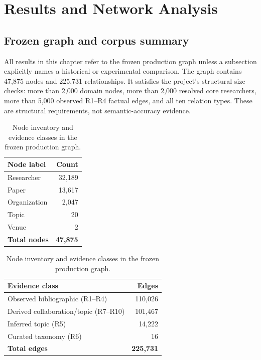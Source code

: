 \chapter{Results and Network Analysis}
\label{chap:results}

\section{Frozen graph and corpus summary}

All results in this chapter refer to the frozen production graph
\GraphVersion{} unless a subsection explicitly names a historical or
experimental comparison. The graph contains 47,875 nodes and 225,731
relationships. It satisfies the project's structural size checks: more than
2,000 domain nodes, more than 2,000 resolved core researchers, more than 5,000
observed R1--R4 factual edges, and all ten relation types. These are structural
requirements, not semantic-accuracy evidence.

\begin{table}[!htbp]
  \centering
  \caption[Frozen graph inventory]{Node inventory and evidence classes in the frozen production graph.}
  \label{tab:graph-inventory}
  \begin{tabularx}{0.82\textwidth}{Xr}
    \toprule
    \textbf{Node label} & \textbf{Count}\\
    \midrule
    Researcher & 32,189\\
    Paper & 13,617\\
    Organization & 2,047\\
    Topic & 20\\
    Venue & 2\\
    \midrule
    \textbf{Total nodes} & \textbf{47,875}\\
    \bottomrule
  \end{tabularx}
  \vspace{0.7em}
  \begin{tabularx}{0.82\textwidth}{Xr}
    \toprule
    \textbf{Evidence class} & \textbf{Edges}\\
    \midrule
    Observed bibliographic (R1--R4) & 110,026\\
    Derived collaboration/topic (R7--R10) & 101,467\\
    Inferred topic (R5) & 14,222\\
    Curated taxonomy (R6) & 16\\
    \midrule
    \textbf{Total edges} & \textbf{225,731}\\
    \bottomrule
  \end{tabularx}
\end{table}
\FloatBarrier

